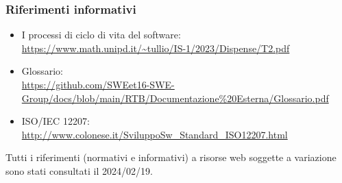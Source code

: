         \subsubsection{Riferimenti informativi}

        \begin{itemize}
            \item I processi di ciclo di vita del software: \\
            \url{https://www.math.unipd.it/~tullio/IS-1/2023/Dispense/T2.pdf}
            \item Glossario: \\
            \url{https://github.com/SWEet16-SWE-Group/docs/blob/main/RTB/Documentazione%20Esterna/Glossario.pdf}
            \item ISO/IEC 12207: \\
            \url{http://www.colonese.it/SviluppoSw_Standard_ISO12207.html}
        \end{itemize}

        Tutti i riferimenti (normativi e informativi) a risorse web soggette a variazione sono stati consultati il 2024/02/19.
